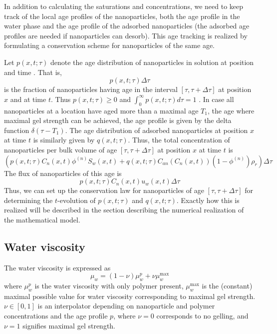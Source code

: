 \documentclass[nanomaterials,article,submit,moreauthors,pdftex]{Definitions/mdpi}
\begin{document}
In addition to calculating the saturations and concentrations, we need to keep track of the local age profiles of the nanoparticles, both the age profile in the water phase and the age profile of the adsorbed nanoparticles (the adsorbed age profiles are needed if nanoparticles can desorb). This age tracking is realized by formulating a conservation scheme for nanoparticles of the same age.   

Let  $p(x,t;\tau)$ denote the age distribution of nanoparticles in solution at position  and time  . That is, 
\begin{equation*}
    p(x,t;\tau)\Delta\tau
\end{equation*}
is the fraction of nanoparticles having age in the interval $[\tau, \tau+\Delta\tau]$  at position $x$ and at time $t$. Thus $p(x,t;\tau)\geq 0$ and $\int_{0}^{\infty}{p(x,t;\tau)d\tau}=1$ . In case all nanoparticles at a location have aged more than a maximal age $T_1$, the age where maximal gel strength can be achieved, the age profile is given by the delta function $\delta(\tau-T_1)$. The age distribution of adsorbed nanoparticles at position $x$ at time $t$ is similarly given by $q(x,t;\tau)$. Thus, the total concentration of nanoparticles per bulk volume of age  $[\tau, \tau+\Delta\tau]$ at position $x$ at time $t$ is
\begin{equation}
    \left(p(x,t;\tau)C_n(x,t)\phi^{(n)}S_w(x,t)+q(x,t;\tau)C_{an}\left(C_n(x,t)\right)(1-\phi^{(n)})\rho_r\right)\Delta\tau
\end{equation}
The flux of nanoparticles of this age is
\begin{equation}
    p(x,t;\tau)C_n(x,t)u_w(x,t)\Delta\tau
\end{equation}
Thus, we can set up the conservation law for nanoparticles of age $[\tau, \tau+\Delta\tau]$  for determining the   $t$-evolution of $p(x,t;\tau)$ and $q(x,t;\tau)$. Exactly how this is realized will be described in the section describing the numerical realization of the mathematical model.

\subsection{Water viscosity}
The water viscosity is expressed as
\begin{equation}
    \mu_w=(1-\nu)\mu^p_w + \nu\mu_w^{\max}
\end{equation}
where $\mu^p_w$ is the water viscosity with only polymer present, $\mu_w^{\max}$ is the (constant) maximal possible value for water viscosity corresponding to maximal gel strength. $\nu\in[0,1]$ is an interpolator depending on nanoparticle and polymer concentrations and the age profile $p$, where  $\nu=0$ corresponds to no gelling, and $\nu=1$  signifies maximal gel strength.
\end{document}
